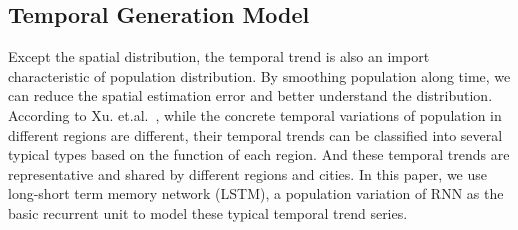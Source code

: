 \documentclass[letterpaper]{article} %
\begin{document}
\subsection{Temporal Generation Model}
Except the spatial distribution, the temporal trend is also an import characteristic of population distribution. By smoothing population along time, we can reduce the spatial estimation error and better understand the distribution. According to Xu. et.al.~\cite{Xu2016ContextawareRP}, while the concrete temporal variations of population in different regions are different, their temporal trends can be classified into several typical types based on the function of each region. And these temporal trends are representative and shared by different regions and cities. In this paper, we use long-short term memory network (LSTM), a population variation of RNN as the basic recurrent unit to model these typical temporal trend series. 

\end{document}
